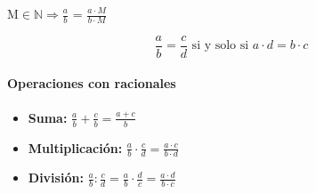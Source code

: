 \documentclass[12pt]{article}
\begin{document}
\begin{center}
    \Large{
        $\text{M} 
        \in 
        \mathbb{N} 
        \Rightarrow 
        \frac{a}{b}$ = $\frac{a \cdot M}{b \cdot M}$
    }
\end{center}

\begin{tcolorbox}[colback=blue!5!white,colframe=blue!50!black,
    colbacktitle=blue!75!black,title={Fracciones equivalentes}]
    \[\frac{a}{b} = \frac{c}{d} \text{ si y solo si } a \cdot d = b \cdot c \]
\end{tcolorbox}

\paragraph{Operaciones con racionales}
\begin{itemize}
    \item {\textbf{Suma: } \Large{$\frac{a}{b} + \frac{c}{b} = \frac{a+c}{b}$}}
    \item {\textbf{Multiplicación: } \Large{$\frac{a}{b} \cdot \frac{c}{d} = \frac{a \cdot c}{b \cdot d}$}}
    \item {\textbf{División: } \Large{$\frac{a}{b} : \frac{c}{d} = \frac{a}{b} \cdot \frac{d}{c} = \frac{a \cdot d}{b \cdot c}$}}
        
\end{itemize}
\end{document}
